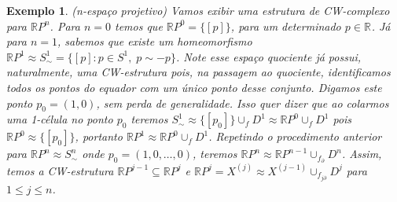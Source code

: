\documentclass[12pt]{book}
\newtheorem{exemplo}[teorema]{Exemplo}
\newcommand{\classe}[1]{[#1]}
\newcommand{\real}[1]{\mathbb{R}^{#1}}
\newcommand{\realprojetivo}[1]{\mathbb{R}P^{#1}}
\newcommand{\skeleton}[1]{X^{(#1)}}
\begin{document}
	\begin{exemplo}
		(n-espaço projetivo) Vamos exibir uma estrutura de CW-complexo para $\realprojetivo{n}$. Para $n=0$ temos que $\realprojetivo{0} = \{\classe{p}\}$, para um determinado $p \in \real{}$. Já para $n=1$, sabemos que existe um homeomorfismo $\realprojetivo{1} \approx S^{1}_{\sim} = \{\classe{p}: p \in S^{1},\; p \sim -p\}$. Note esse espaço quociente já possui, naturalmente, uma CW-estrutura pois, na passagem ao quociente, identificamos todos os pontos do equador com um único ponto desse conjunto. Digamos este ponto $p_{0} = (1,0)$, sem perda de generalidade. Isso quer dizer que ao colarmos uma 1-célula no ponto $p_{0}$ teremos $S^{1}_{\sim} \approx \{[p_{0}]\} \cup_{f}D^{1} \approx \realprojetivo{0}\cup_{f}D^{1} $ pois $\realprojetivo{0} \approx \{[p_{0}]\}$, portanto $ \realprojetivo{1} \approx \realprojetivo{0}\cup_{f}D^{1}$. Repetindo o procedimento anterior para $\realprojetivo{n} \approx S^{n}_{\sim} $ onde $p_{0} = (1,0,\dots, 0)$, teremos $\realprojetivo{n} \approx \realprojetivo{n-1} \cup_{f_{\partial}}D^{n}$. Assim, temos a CW-estrutura $\realprojetivo{j-1} \subseteq \realprojetivo{j}$ e $\realprojetivo{j} = \skeleton{j} \approx \skeleton{j-1}\cup_{f_{j\partial}}D^{j}$ para $1\leq j \leq n$.
	\end{exemplo}
	
\end{document}
